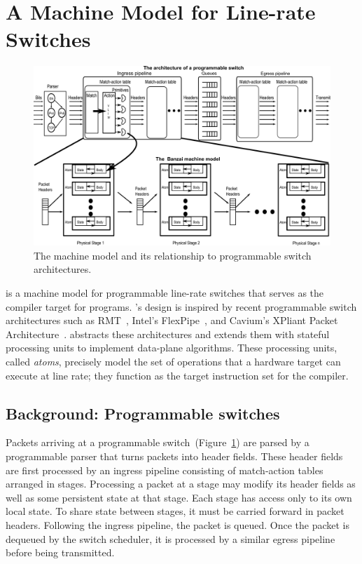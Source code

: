 \section{A Machine Model for Line-rate Switches}
\label{s:absmachine}

\begin{figure}[!t]
  \includegraphics[width=\textwidth]{banzai-fig.pdf}
  \caption{The \absmachine machine model and its relationship to
  programmable switch architectures.}
  \label{fig:switch}
\end{figure}

\absmachine is a machine model for programmable line-rate switches
that serves as the compiler target for \pktlanguage programs.
\absmachine's design is inspired by recent programmable switch
architectures such as RMT~\cite{rmt}, Intel's
FlexPipe~\cite{flexpipe}, and Cavium's XPliant Packet
Architecture~\cite{xpliant}. \absmachine abstracts these architectures
and extends them with stateful processing units to implement
data-plane algorithms. These processing units, called {\em atoms},
precisely model the set of operations that a hardware target can
execute at line rate; they function as the target instruction set for
the \pktlanguage compiler.

\subsection{Background: Programmable switches}
Packets arriving at a programmable switch~(Figure~\ref{fig:switch}) are parsed
by a programmable parser that turns packets into header fields. These header
fields are first processed by an ingress pipeline consisting of match-action
tables arranged in stages. Processing a packet at a stage may modify its header
fields as well as some persistent state at that stage. Each stage has access
only to its own local state. To share state between stages, it must be carried
forward in packet headers. Following the ingress pipeline, the packet is
queued. Once the packet is dequeued by the switch scheduler, it is processed by
a similar egress pipeline before being transmitted.

